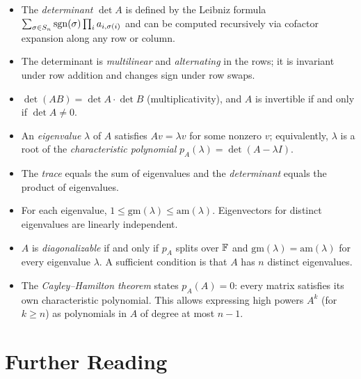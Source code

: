 \documentclass[11pt,a4paper]{article}
\begin{document}
\begin{itemize}
  \item The \emph{determinant} $\det A$ is defined by the Leibniz formula
        $\sum_{\sigma \in S_n} \operatorname{sgn}(\sigma) \prod_i a_{i,\sigma(i)}$ and
        can be computed recursively via cofactor expansion along any row or
        column.

  \item The determinant is \emph{multilinear} and \emph{alternating} in
        the rows; it is invariant under row addition and changes sign under
        row swaps.

  \item $\det(AB) = \det A \cdot \det B$ (multiplicativity), and $A$ is
        invertible if and only if $\det A \neq 0$.

  \item An \emph{eigenvalue} $\lambda$ of $A$ satisfies $Av = \lambda v$
        for some nonzero $v$; equivalently, $\lambda$ is a root of the
        \emph{characteristic polynomial} $p_A(\lambda) = \det(A - \lambda I)$.

  \item The \emph{trace} equals the sum of eigenvalues and the
        \emph{determinant} equals the product of eigenvalues.

  \item For each eigenvalue, $1 \leq \mathrm{gm}(\lambda) \leq
        \mathrm{am}(\lambda)$.  Eigenvectors for distinct eigenvalues
        are linearly independent.

  \item $A$ is \emph{diagonalizable} if and only if $p_A$ splits over
        $\mathbb{F}$ and $\mathrm{gm}(\lambda) = \mathrm{am}(\lambda)$ for every
        eigenvalue $\lambda$.  A sufficient condition is that $A$ has $n$
        distinct eigenvalues.

  \item The \emph{Cayley--Hamilton theorem} states $p_A(A) = 0$: every
        matrix satisfies its own characteristic polynomial.  This allows
        expressing high powers $A^k$ (for $k \geq n$) as polynomials
        in $A$ of degree at most $n - 1$.
\end{itemize}

\section{Further Reading}
\label{sec:further_reading}
\end{document}
